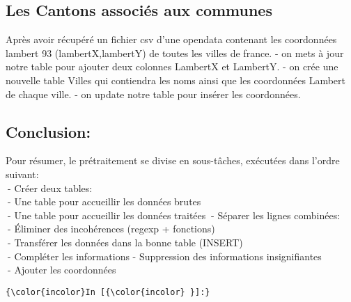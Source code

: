 \documentclass[11pt]{article}
\begin{document}
    \hypertarget{les-cantons-associuxe9s-aux-communes}{%
\subsection{Les Cantons associés aux
communes}\label{les-cantons-associuxe9s-aux-communes}}

Après avoir récupéré un fichier csv d'une opendata contenant les
coordonnées lambert 93 (lambertX,lambertY) de toutes les villes de
france. - on mets à jour notre table pour ajouter deux colonnes LambertX
et LambertY. - on crée une nouvelle table Villes qui contiendra les noms
ainsi que les coordonnées Lambert de chaque ville. - on update notre
table pour insérer les coordonnées.

\hypertarget{conclusion}{%
\subsection{Conclusion:}\label{conclusion}}

Pour résumer, le prétraitement se divise en sous-tâches, exécutées dans
l'ordre suivant: \\
$\>$- Créer deux tables: \\
$\>$- Une table pour accueillir les données brutes \\
$\>$- Une table pour accueillir les données traitées
$\>$- Séparer les lignes combinées:\\
$\>$- Éliminer des incohérences (regexp + fonctions)\\
$\>$- Transférer les données dans la bonne table (INSERT)\\ 
$\>$- Compléter les informations - Suppression des informations insignifiantes\\
$\>$- Ajouter les coordonnées\\

   \begin{Verbatim}[commandchars=\\\{\},fontsize=\scriptsize]
{\color{incolor}In [{\color{incolor} }]:} 
\end{Verbatim}


    
    
    
    
\end{document}

